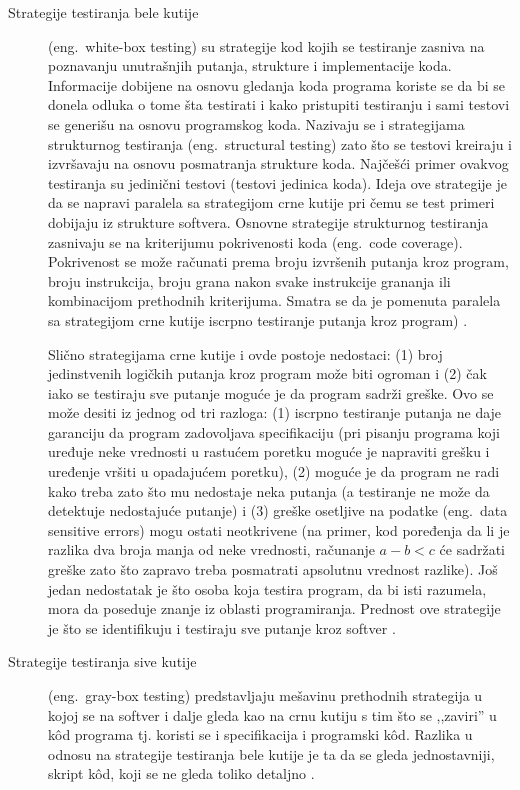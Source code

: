 \documentclass[12pt,oneside]{memoir}
\begin{document}
\begin{description}
\item [Strategije testiranja bele kutije] (eng.~white-box testing) su strategije kod kojih se testiranje zasniva na poznavanju unutrašnjih putanja, strukture i implementacije koda. Informacije dobijene na osnovu gledanja koda programa koriste se da bi se donela odluka o tome šta testirati i kako pristupiti testiranju i sami testovi se generišu na osnovu programskog koda. Nazivaju se i strategijama strukturnog testiranja (eng.~structural testing) zato što se testovi kreiraju i izvršavaju na osnovu posmatranja strukture koda. Najčešći primer ovakvog testiranja su jedinični testovi (testovi jedinica koda). Ideja ove strategije je da se napravi paralela sa strategijom crne kutije pri čemu se test primeri dobijaju iz strukture softvera. Osnovne strategije strukturnog testiranja zasnivaju se na kriterijumu pokrivenosti koda (eng.~code coverage). Pokrivenost se može računati prema broju izvršenih putanja kroz program, broju instrukcija, broju grana nakon svake instrukcije grananja ili kombinacijom prethodnih kriterijuma. Smatra se da je pomenuta paralela sa strategijom crne kutije iscrpno testiranje putanja kroz program) \cite{PGtSTD, SoftTest, mvj, ArtOfST}. 

Slično strategijama crne kutije i ovde postoje nedostaci: (1) broj jedinstvenih logičkih putanja kroz program može biti ogroman i (2) čak iako se testiraju sve putanje moguće je da program sadrži greške. Ovo se može desiti iz jednog od tri razloga: (1) iscrpno testiranje putanja ne daje garanciju da program zadovoljava specifikaciju (pri pisanju programa koji uređuje neke vrednosti u rastućem poretku moguće je napraviti grešku i uređenje vršiti u opadajućem poretku), (2) moguće je da program ne radi kako treba zato što mu nedostaje neka putanja (a testiranje ne može da detektuje nedostajuće putanje) i (3) greške osetljive na podatke (eng.~data sensitive errors) mogu ostati neotkrivene (na primer, kod poređenja da li je razlika dva broja manja od neke vrednosti, računanje $a-b<c$ će sadržati greške zato što zapravo treba posmatrati apsolutnu vrednost razlike). Još jedan nedostatak je što osoba koja testira program, da bi isti razumela, mora da poseduje znanje iz oblasti programiranja. Prednost ove strategije je što se identifikuju i testiraju sve putanje kroz softver \cite{mvj, ArtOfST, PGtSTD}.

\item [Strategije testiranja sive kutije] (eng.~gray-box testing) predstavljaju mešavinu prethodnih strategija u kojoj se na softver i dalje gleda kao na crnu kutiju s tim što se ,,zaviri'' u  k\^od programa tj. koristi se i specifikacija i programski  k\^od.  Razlika u odnosu na strategije testiranja bele kutije je ta da se gleda jednostavniji, skript k\^od, koji se ne gleda toliko detaljno \cite{mvj, SoftTest}.
\end{description}
\end{document}
